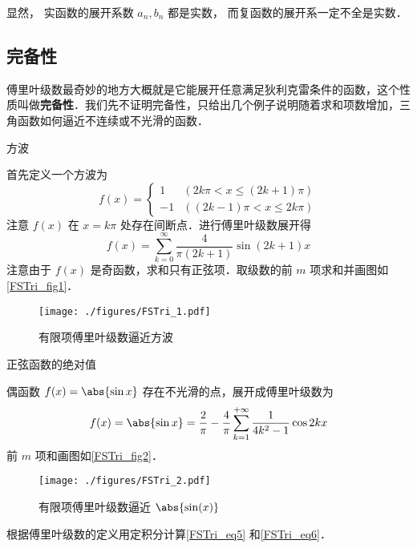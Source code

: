 显然， 实函数的展开系数 $a_n, b_n$ 都是实数， 而复函数的展开系一定不全是实数．

\subsection{完备性}
傅里叶级数最奇妙的地方大概就是它能展开任意满足狄利克雷条件的函数，这个性质叫做\textbf{完备性}．我们先不证明完备性，只给出几个例子说明随着求和项数增加，三角函数如何逼近不连续或不光滑的函数．

\begin{example}{方波}

首先定义一个方波为
\begin{equation}\label{FSTri_eq7}
f(x) = 
\begin{cases}
1  & (2k\pi < x \leqslant (2k + 1)\pi) \\
- 1 &  ((2k - 1)\pi < x \leqslant 2k\pi)
\end{cases}
\end{equation}
注意 $f(x)$ 在 $x=k\pi$ 处存在间断点．进行傅里叶级数展开得
\begin{equation}\label{FSTri_eq5}
f(x) = \sum_{k = 0}^\infty \frac{4}{\pi (2k + 1)}\sin (2k + 1)x
\end{equation}
注意由于 $f(x)$ 是奇函数，求和只有正弦项．取级数的前 $m$ 项求和并画图如\autoref{FSTri_fig1}．

\begin{figure}[ht]
\centering
\texttt{[image: ./figures/FSTri\_1.pdf]}
\caption{有限项傅里叶级数逼近方波}\label{FSTri_fig1}
\end{figure}
\end{example}

\begin{example}{正弦函数的绝对值} %

偶函数 $f(x) = \abs{\sin x}$ 存在不光滑的点，展开成傅里叶级数为
\begin{equation}\label{FSTri_eq6}
f(x) = \abs{\sin x} = \frac{2}{\pi } - \frac{4}{\pi }\sum_{k = 1}^{+\infty} \frac{1}{4 k^2 - 1}\cos 2k x
\end{equation}
前 $m$ 项和画图如\autoref{FSTri_fig2}．
\begin{figure}[ht]
\centering
\texttt{[image: ./figures/FSTri\_2.pdf]}
\caption{有限项傅里叶级数逼近 $\abs{\sin(x)}$}\label{FSTri_fig2}
\end{figure}
\end{example}

\begin{exercise}{}
根据傅里叶级数的定义用定积分计算\autoref{FSTri_eq5} 和\autoref{FSTri_eq6}．
\end{exercise}

